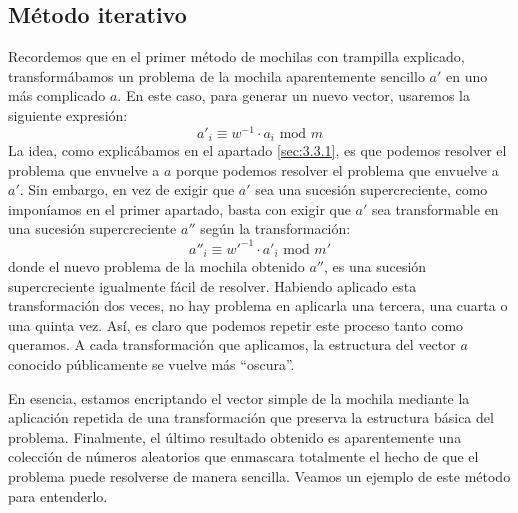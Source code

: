     \subsection{Método iterativo}

    Recordemos que en el primer método de mochilas con trampilla explicado, transformábamos un problema de la mochila aparentemente sencillo $a'$ en uno más complicado $a$. En este caso, para generar un nuevo  vector, usaremos la siguiente expresión:
    \begin{equation}
        a'_{i} \equiv w^{-1} \cdot a_{i} \text{ mod } m
    \end{equation}
    La idea, como explicábamos en el apartado \ref{sec:3.3.1}, es que podemos resolver el problema que envuelve a $a$ porque podemos resolver el problema que envuelve a $a'$. Sin embargo, en vez de exigir que $a'$ sea una sucesión supercreciente, como imponíamos en el primer apartado, basta con exigir que $a'$ sea transformable en una sucesión supercreciente $a''$ según la transformación:
    \begin{equation}
        a''_{i} \equiv w'^{-1} \cdot a'_{i} \text{ mod } m'
    \end{equation}
    donde el nuevo problema de la mochila obtenido $a''$, es una sucesión supercreciente igualmente fácil de resolver. Habiendo aplicado esta transformación dos veces, no hay problema en aplicarla una tercera, una cuarta o una quinta vez. Así, es claro que podemos repetir este proceso tanto como queramos. A cada transformación que aplicamos, la estructura del vector $a$ conocido públicamente se vuelve más ``oscura''. 
    
    En esencia, estamos encriptando el vector simple de la mochila mediante la aplicación repetida de una transformación que preserva la estructura básica del problema. Finalmente, el último resultado obtenido es aparentemente una colección de números aleatorios que enmascara totalmente el hecho de que el problema puede resolverse de manera sencilla. Veamos un ejemplo de este método para entenderlo.

